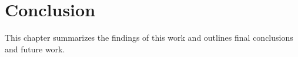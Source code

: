 % 
% 
% 

\chapter{Conclusion}
\label{ch:conclusion}
This chapter summarizes the findings of this work and outlines final conclusions and future work.

